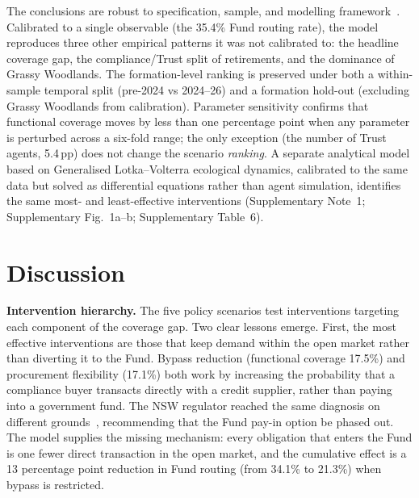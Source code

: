 \documentclass[pdflatex,sn-nature,oneside]{sn-jnl}
\begin{document}
The conclusions are robust to specification, sample, and modelling
framework~\cite{Fagiolo2007}. Calibrated to a single observable (the
35.4\% Fund routing rate), the model reproduces three other empirical
patterns it was not calibrated to: the headline coverage gap, the
compliance/Trust split of retirements, and the dominance of Grassy
Woodlands. The formation-level ranking is preserved under both
a within-sample temporal split (pre-2024 vs 2024--26) and a formation
hold-out (excluding Grassy Woodlands from calibration). Parameter
sensitivity confirms that functional coverage moves by less than one
percentage point when any parameter is perturbed across a six-fold
range; the only exception (the number of Trust agents, 5.4\,pp) does
not change the scenario \emph{ranking}. A separate analytical model
based on Generalised Lotka--Volterra ecological dynamics, calibrated to
the same data but solved as differential equations rather than agent
simulation, identifies the same most- and least-effective interventions
(Supplementary Note~1; Supplementary Fig.~1a--b; Supplementary Table~6).



\section{Discussion}\label{sec:discussion}

\textbf{Intervention hierarchy.}
The five policy scenarios test interventions targeting each component of the
coverage gap. Two clear lessons emerge.
First, the most effective interventions are those that keep demand within
the open market rather than diverting it to the Fund.
Bypass reduction (functional coverage 17.5\%) and procurement flexibility
(17.1\%) both work by increasing the probability that a compliance buyer
transacts directly with a credit supplier, rather than paying into a
government fund.
The NSW regulator reached the same diagnosis on different
grounds~\cite{IPART2023}, recommending that the Fund pay-in option be
phased out. The model supplies the missing mechanism: every
obligation that enters the Fund is one fewer direct transaction in
the open market, and the cumulative effect is a 13 percentage point
reduction in Fund routing (from 34.1\% to 21.3\%) when bypass is
restricted.
\end{document}
